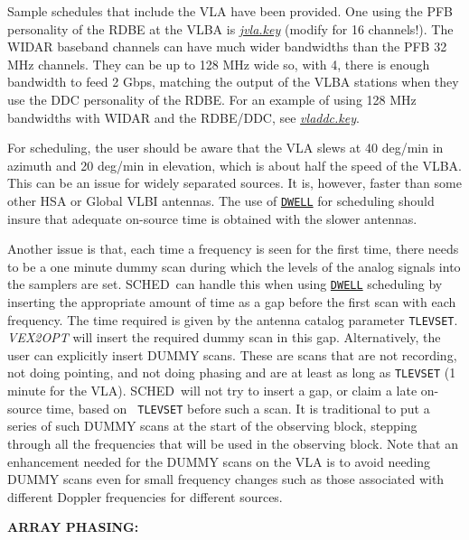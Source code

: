 \documentclass{report}
\newcommand{\schedb}{{\sc SCHED~}}
\begin{document}
Sample schedules that include the VLA have been provided.  One using
the PFB personality of the RDBE at the VLBA is 
{\href{examples/jvla.key}{{\sl jvla.key}}}
(modify for 16 channels!).  The WIDAR
baseband channels can have much wider bandwidths than the PFB 32 MHz
channels.  They can be up to 128 MHz wide so, with 4, there is enough
bandwidth to feed 2 Gbps, matching the output of the VLBA stations
when they use the DDC personality of the RDBE.  For an example of
using 128 MHz bandwidths with WIDAR and the RDBE/DDC, see
{\href{examples/vladdc.key}{{\sl vladdc.key}}}. 

For scheduling, the user should be aware that the VLA slews at 40
deg/min in azimuth and 20 deg/min in elevation, which is about half
the speed of the VLBA.  This can be an issue for widely separated
sources.  It is, however, faster than some other HSA or Global VLBI
antennas.  The use of 
{\hyperref[MP:DWELL]{{\tt DWELL}}} for scheduling
should insure that adequate on-source time is obtained with the
slower antennas.

Another issue is that, each time a frequency is seen for the first
time, there needs to be a one minute dummy scan during which the
levels of the analog signals into the samplers are set.  \schedb can
handle this when using 
{\hyperref[MP:DWELL]{{\tt DWELL}}} scheduling by
inserting the appropriate amount of time as a gap before the first
scan with each frequency.  The time required is given by the antenna
catalog parameter {\tt TLEVSET}.  {\sl VEX2OPT} will insert the
required dummy scan in this gap.  Alternatively, the user can
explicitly insert DUMMY scans.  These are scans that are not
recording, not doing pointing, and not doing phasing and are at least
as long as {\tt TLEVSET} (1 minute for the VLA).  \schedb will not try
to insert a gap, or claim a late on-source time, based on {\tt
TLEVSET} before such a scan.  It is traditional to put a series of
such DUMMY scans at the start of the observing block, stepping through
all the frequencies that will be used in the observing block.  Note
that an enhancement needed for the DUMMY scans on the VLA is to avoid
needing DUMMY scans even for small frequency changes such as those
associated with different Doppler frequencies for different sources.

{\bf ARRAY PHASING:}
\end{document}

